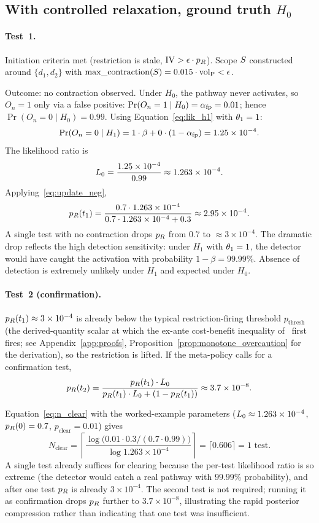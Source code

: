 \subsection{With controlled relaxation, ground truth $H_0$}

\paragraph{Test~1.}
Initiation criteria met (restriction is stale,
$\mathrm{IV} > \epsilon \cdot p_R$).  Scope $S$ constructed
around $\{d_1, d_2\}$ with $\mathrm{max\_contraction}(S) = 0.015 \cdot {\operatorname{vol}_{\mathrm{P}}} <
\epsilon$.

Outcome: no contraction observed.  Under $H_0$, the pathway
never activates, so $O_n = 1$ only via a false positive:
$\Pr(O_n = 1 \mid H_0) = \alpha_{\mathrm{fp}} = 0.01$; hence
$\Pr(O_n = 0 \mid H_0) = 0.99$.  Using
Equation~\eqref{eq:lik_h1} with $\theta_1 = 1$:
$$
\Pr(O_n = 0 \mid H_1)
   = 1 \cdot \beta + 0 \cdot (1 - \alpha_{\mathrm{fp}})
   = 1.25 \times 10^{-4}.
$$
The likelihood ratio is
$$
L_0 = \frac{1.25 \times 10^{-4}}{0.99}
       \approx 1.263 \times 10^{-4}.
$$
Applying~\eqref{eq:update_neg},
$$
p_R(t_1) = \frac{0.7 \cdot 1.263 \times 10^{-4}}
                {0.7 \cdot 1.263 \times 10^{-4} + 0.3}
        \approx 2.95 \times 10^{-4}.
$$
A single test with no contraction drops $p_R$ from $0.7$ to
$\approx 3 \times 10^{-4}$.  The dramatic drop reflects the high
detection sensitivity: under $H_1$ with $\theta_1 = 1$, the
detector would have caught the activation with probability
$1 - \beta = 99.99\%$.  Absence of detection is extremely
unlikely under $H_1$ and expected under $H_0$.

\paragraph{Test~2 (confirmation).}
$p_R(t_1) \approx 3 \times 10^{-4}$ is already below the typical
restriction-firing threshold $p_{\mathrm{thresh}}$ (the
derived-quantity scalar at which the ex-ante cost-benefit
inequality of~\citep[Proposition~1]{lasser2026horizon} first
fires; see Appendix~\ref{app:proofs},
Proposition~\ref{prop:monotone_overcaution} for the derivation),
so the restriction is lifted.  If the meta-policy
calls for a confirmation test,
$$
p_R(t_2) = \frac{p_R(t_1) \cdot L_0}
                {p_R(t_1) \cdot L_0 + (1 - p_R(t_1))}
        \approx 3.7 \times 10^{-8}.
$$

Equation~\eqref{eq:n_clear} with the worked-example parameters
($L_0 \approx 1.263 \times 10^{-4}$, $p_R(0) = 0.7$,
$p_{\mathrm{clear}} = 0.01$) gives
$$
N_{\mathrm{clear}}
  = \left\lceil
    \frac{\log\bigl(0.01 \cdot 0.3 /(0.7 \cdot 0.99)\bigr)}
         {\log 1.263 \times 10^{-4}}
  \right\rceil
  = \lceil 0.606 \rceil = 1 \text{ test}.
$$
A single test already suffices for clearing because the per-test
likelihood ratio is so extreme (the detector would catch a real
pathway with $99.99\%$ probability), and after one test $p_R$ is
already $3 \times 10^{-4}$.  The second test is not required;
running it as confirmation drops $p_R$ further to
$3.7 \times 10^{-8}$, illustrating the rapid posterior compression
rather than indicating that one test was insufficient.


